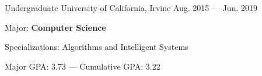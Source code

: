 \begin{entries}
  \vspace{-1.0mm}
  \entry%
    {Undergraduate}%
    {University of California, Irvine}%
    {}%
    {Aug. 2015 --- Jun. 2019}%
    {
      \begin{entryitems}
        \item Major: \textbf{Computer Science}
        \vspace{2.0mm}
        \begin{entryitems}
          \item Specializations: Algorithms and Intelligent Systems
        \end{entryitems}
        \vspace{2.0mm}
        \item Major GPA: 3.73 --- Cumulative GPA: 3.22%
      \end{entryitems}
    }%
\end{entries}